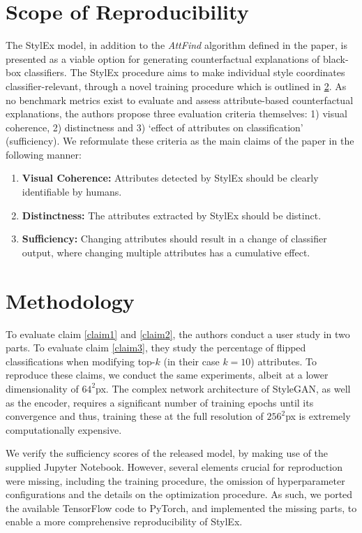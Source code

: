 \section{Scope of Reproducibility}

The StylEx model, in addition to the \textit{AttFind} algorithm defined in the paper, is presented as a viable option for generating counterfactual explanations of black-box classifiers. The StylEx procedure aims to make individual style coordinates classifier-relevant, through a novel training procedure which is outlined in \ref{methodology}. As no benchmark metrics exist to evaluate and assess attribute-based counterfactual explanations, the authors propose three evaluation criteria themselves: 1) visual coherence, 2) distinctness and 3) `effect of attributes on classification' (sufficiency). We reformulate these criteria as the main claims of the paper in the following manner:

\begin{enumerate}
    \item \label{claim1}\textbf{Visual Coherence:} Attributes detected by StylEx should be clearly identifiable by humans.
    \item \label{claim2}\textbf{Distinctness:} The attributes extracted by StylEx should be distinct.
    \item \label{claim3}\textbf{Sufficiency:} Changing attributes should result in a change of classifier output, where changing multiple attributes has a cumulative effect.
\end{enumerate}

\section{Methodology}
\label{methodology}

To evaluate claim \ref{claim1} and \ref{claim2}, the authors conduct a user study in two parts. To evaluate claim \ref{claim3}, they study the percentage of flipped classifications when modifying top-$k$ (in their case $k=10$) attributes. To reproduce these claims, we conduct the same experiments, albeit at a lower dimensionality of $64^2$px. The complex network architecture of StyleGAN, as well as the encoder, requires a significant number of training epochs until its convergence and thus, training these at the full resolution of $256^2$px is extremely computationally expensive.

We verify the sufficiency scores of the released model, by making use of the supplied Jupyter Notebook. However, several elements crucial for reproduction were missing, including the training procedure, the omission of hyperparameter configurations and the details on the optimization procedure. As such, we ported the available TensorFlow code to PyTorch, and implemented the missing parts, to enable a more comprehensive reproducibility of StylEx.

